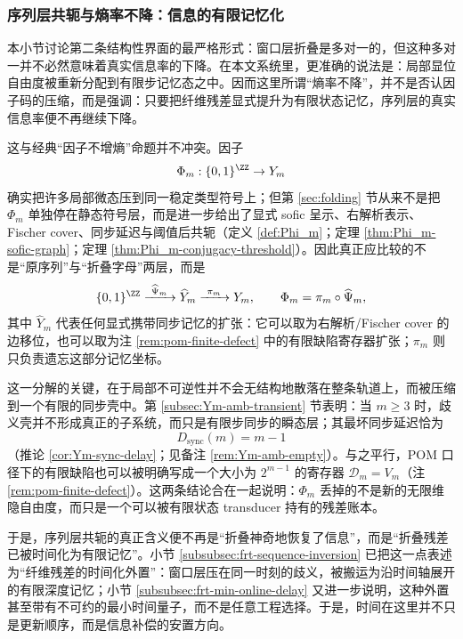\subsubsection{序列层共轭与熵率不降：信息的有限记忆化}\label{subsubsec:insight-entropy-memory}
本小节讨论第二条结构性界面的最严格形式：窗口层折叠是多对一的，但这种多对一并不必然意味着真实信息率的下降。在本文系统里，更准确的说法是：局部显位自由度被重新分配到有限步记忆态之中。因而这里所谓“熵率不降”，并不是否认因子码的压缩，而是强调：只要把纤维残差显式提升为有限状态记忆，序列层的真实信息率便不再继续下降。

这与经典“因子不增熵”命题并不冲突。因子
\[
\Phi_m:\{0,1\}^{\ZZ}\to Y_m
\]
确实把许多局部微态压到同一稳定类型符号上；但第 \ref{sec:folding} 节从来不是把 \(\Phi_m\) 单独停在静态符号层，而是进一步给出了显式 sofic 呈示、右解析表示、Fischer cover、同步延迟与阈值后共轭（定义 \ref{def:Phi_m}；定理 \ref{thm:Phi_m-sofic-graph}；定理 \ref{thm:Phi_m-conjugacy-threshold}）。因此真正应比较的不是“原序列”与“折叠字母”两层，而是
\[
\{0,1\}^{\ZZ}\xrightarrow{\ \widehat\Psi_m\ }\widehat Y_m \xrightarrow{\ \pi_m\ } Y_m,
\qquad
\Phi_m=\pi_m\circ\widehat\Psi_m,
\]
其中 \(\widehat Y_m\) 代表任何显式携带同步记忆的扩张：它可以取为右解析/Fischer cover 的边移位，也可以取为注 \ref{rem:pom-finite-defect} 中的有限缺陷寄存器扩张；\(\pi_m\) 则只负责遗忘这部分记忆坐标。

这一分解的关键，在于局部不可逆性并不会无结构地散落在整条轨道上，而被压缩到一个有限的同步壳中。第 \ref{subsec:Ym-amb-transient} 节表明：当 \(m\ge 3\) 时，歧义壳并不形成真正的子系统，而只是有限步同步的瞬态层；其最坏同步延迟恰为
\[
D_{\mathrm{sync}}(m)=m-1
\]
（推论 \ref{cor:Ym-sync-delay}；见备注 \ref{rem:Ym-amb-empty}）。与之平行，POM 口径下的有限缺陷也可以被明确写成一个大小为 \(2^{m-1}\) 的寄存器 \(\mathcal D_m=V_m\)（注 \ref{rem:pom-finite-defect}）。这两条结论合在一起说明：\(\Phi_m\) 丢掉的不是新的无限维隐自由度，而只是一个可以被有限状态 transducer 持有的残差账本。

于是，序列层共轭的真正含义便不再是“折叠神奇地恢复了信息”，而是“折叠残差已被时间化为有限记忆”。小节 \ref{subsubsec:frt-sequence-inversion} 已把这一点表述为“纤维残差的时间化外置”：窗口层压在同一时刻的歧义，被搬运为沿时间轴展开的有限深度记忆；小节 \ref{subsubsec:frt-min-online-delay} 又进一步说明，这种外置甚至带有不可约的最小时间量子，而不是任意工程选择。于是，时间在这里并不只是更新顺序，而是信息补偿的安置方向。

